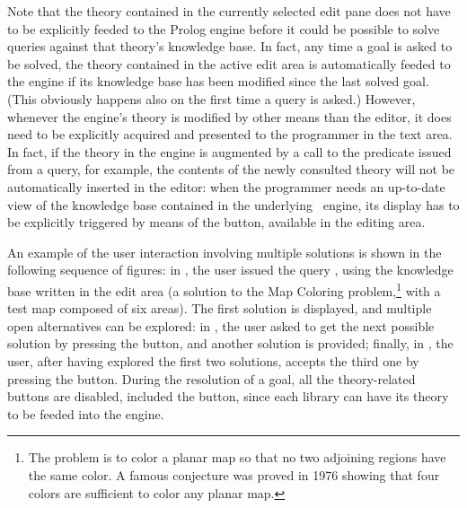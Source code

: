 Note that the theory contained in the currently selected edit pane does not have to be explicitly feeded to the Prolog engine before it could be possible to solve queries against that theory's knowledge base.
%
In fact, any time a goal is asked to be solved, the theory contained in the active edit area is automatically feeded to the engine if its knowledge base has been modified since the last solved goal.
%
(This obviously happens also on the first time a query is asked.)
%
However, whenever the engine's theory is modified by other means than the editor, it does need to be explicitly acquired and presented to the programmer in the text area.
%
In fact, if the theory in the engine is augmented by a call to the predicate  issued from a query, for example, the contents of the newly consulted theory will not be automatically inserted in the editor:
%
when the programmer needs an up-to-date view of the knowledge base contained in the underlying \tuprolog\ engine, its display has to be explicitly triggered by means of the  button, available
in the editing area.

An example of the user interaction involving multiple solutions is shown in the following sequence of figures:
%
in , the user issued the query , using the knowledge base written in the edit area (a solution to the Map Coloring problem,\footnote{The problem is to color a planar map so that no two adjoining regions have the same color. A famous conjecture was proved in 1976 showing that four colors are sufficient to color any planar map.} with a test map composed of six areas).
%
The first solution is displayed, and multiple open alternatives can be explored:
%
in , the user asked to get the next possible solution by pressing the  button, and another solution is provided;
%
finally, in , the user, after having explored the first two solutions, accepts the third one by pressing the  button.
%
During the resolution of a goal, all the theory-related buttons are disabled, included the  button, since each library can have its theory to be feeded into the engine.

